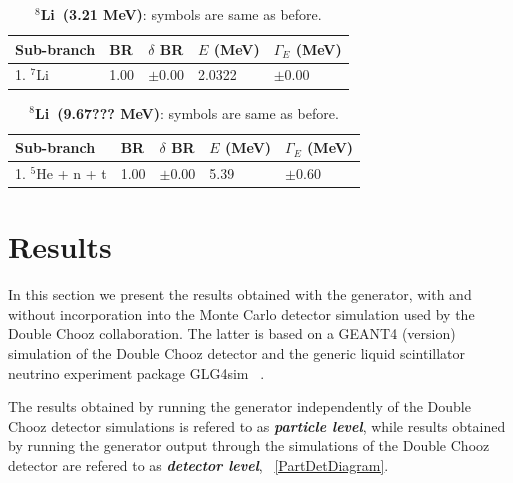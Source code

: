 \documentclass{JINST}
\newcommand{\liEIGHT}{$^{8}$Li~}
\newcommand{\liSEVEN}{$^{7}$Li~}
\begin{document}
\begin{table}[tb]
\caption{\label{tab_he_4} {\bf \liEIGHT (3.21 MeV)}: symbols are same as before.}
\begin{center}
\begin{small}
\begin{tabular}{l l l l l}
\hline
\hline
Sub-branch & BR & $\delta$ BR & $E$ (MeV) &
$\Gamma_E$ (MeV) \\
\hline
1. \liSEVEN & 1.00 & $\pm$0.00 & 2.0322& $\pm$0.00 \\ 
\hline
\hline
\end{tabular}
\end{small}
\end{center}
\end{table}

\begin{table}[tb]
\caption{\label{tab_he_5} {\bf \liEIGHT (9.67??? MeV)}: symbols are same as before.}
\begin{center}
\begin{small}
\begin{tabular}{l l l l l}
\hline
\hline
Sub-branch & BR & $\delta$ BR & $E$ (MeV) &
$\Gamma_E$ (MeV) \\
\hline
1. $^{5}$He + n + t & 1.00 & $\pm$0.00 & 5.39& $\pm$0.60 \\ 
\hline
\hline
\end{tabular}
\end{small}
\end{center}
\end{table}


 \section{Results}
\label{section2} 
 In this section we present the results obtained with the generator,
 with and without incorporation into the Monte Carlo detector simulation used by
the Double Chooz
 collaboration.
The latter is based on 
 a GEANT4 (version) ~\cite{Geant4} simulation of the Double Chooz detector and the
generic liquid scintillator
 neutrino experiment package GLG4sim ~\cite{GLG4sim}. 
 
 
 
 The results obtained by running
the generator 
 independently of the Double Chooz detector simulations is refered to as
\textbf{{\emph{particle level}}}, while 
 results obtained by running the generator output through the simulations of the
Double Chooz detector 
 are refered to as  \textbf{{\emph{detector level}}}, ~\ref{PartDetDiagram}.
\end{document}
